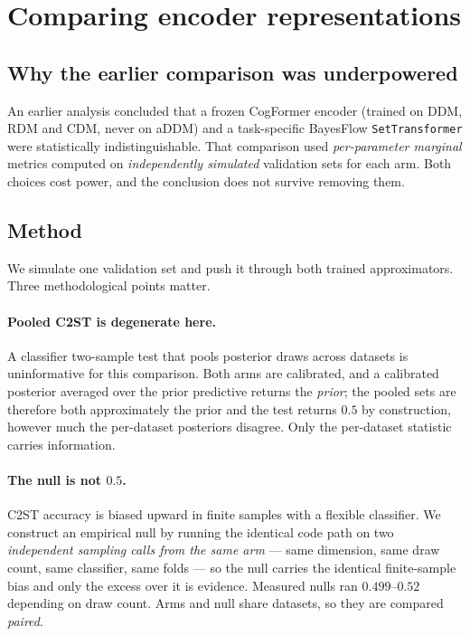 \documentclass[11pt]{article}
\begin{document}
\section{Comparing encoder representations}

\subsection{Why the earlier comparison was underpowered}

An earlier analysis concluded that a frozen CogFormer encoder (trained on DDM, RDM and
CDM, never on aDDM) and a task-specific BayesFlow \texttt{SetTransformer} were
statistically indistinguishable. That comparison used \emph{per-parameter marginal}
metrics computed on \emph{independently simulated} validation sets for each arm. Both
choices cost power, and the conclusion does not survive removing them.

\subsection{Method}

We simulate one validation set and push it through both trained approximators. Three
methodological points matter.

\paragraph{Pooled C2ST is degenerate here.} A classifier two-sample test that pools
posterior draws across datasets is uninformative for this comparison. Both arms are
calibrated, and a calibrated posterior averaged over the prior predictive returns the
\emph{prior}; the pooled sets are therefore both approximately the prior and the test
returns $0.5$ by construction, however much the per-dataset posteriors disagree. Only
the per-dataset statistic carries information.

\paragraph{The null is not $0.5$.} C2ST accuracy is biased upward in finite samples
with a flexible classifier. We construct an empirical null by running the identical
code path on two \emph{independent sampling calls from the same arm} --- same
dimension, same draw count, same classifier, same folds --- so the null carries the
identical finite-sample bias and only the excess over it is evidence. Measured nulls
ran $0.499$--$0.52$ depending on draw count. Arms and null share datasets, so they are
compared \emph{paired}.
\end{document}
